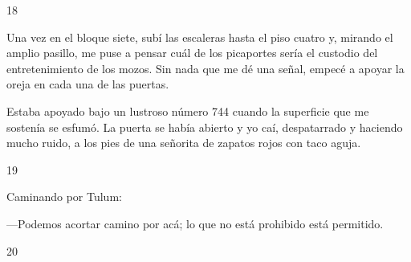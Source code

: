 \documentclass[12pt,twoside,openright,a5paper]{book}
\begin{document}
\vspace{0.5cm}

\hrulefill \hspace{0.1cm}\decofourleft\hspace{0.2cm} 18 \hspace{0.2cm}\decofourright \hspace{0.1cm}\hrulefill

\nopagebreak

\vspace{0.5cm}

\nopagebreak

Una vez en el bloque siete, subí las escaleras hasta el piso cuatro y,
mirando el amplio pasillo, me puse a pensar cuál de los picaportes sería el
custodio del entretenimiento de los mozos. Sin nada que me dé una señal,
empecé a apoyar la oreja en cada una de las puertas.

Estaba apoyado bajo un lustroso número 744 cuando la superficie que me
sostenía se esfumó. La puerta se había abierto y yo caí, despatarrado
y haciendo mucho ruido, a los pies de una señorita de zapatos rojos con
taco aguja.

\vspace{0.5cm}

\hrulefill \hspace{0.1cm}\decofourleft\hspace{0.2cm} 19 \hspace{0.2cm}\decofourright \hspace{0.1cm}\hrulefill

\nopagebreak

\vspace{0.5cm}

\nopagebreak

Caminando por Tulum:

---Podemos acortar camino por acá; lo que no está
prohibido está permitido.

\vspace{0.5cm}

\hrulefill \hspace{0.1cm}\decofourleft\hspace{0.2cm} 20 \hspace{0.2cm}\decofourright \hspace{0.1cm}\hrulefill

\nopagebreak

\vspace{0.5cm}

\nopagebreak
\end{document}
